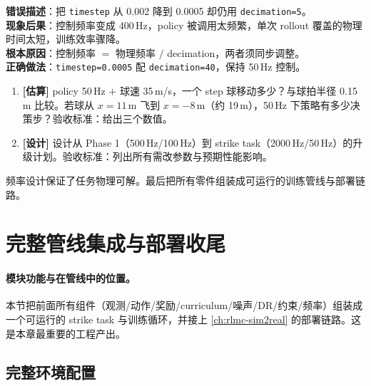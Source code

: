 \begin{pitfall}
\textbf{错误描述}：把 \verb|timestep| 从 0.002 降到 0.0005 却仍用 \verb|decimation=5|。\\
\textbf{现象后果}：控制频率变成 400\,Hz，policy 被调用太频繁，单次 rollout 覆盖的物理时间太短，训练效率骤降。\\
\textbf{根本原因}：控制频率 $=$ 物理频率 $/$ decimation，两者须同步调整。\\
\textbf{正确做法}：\verb|timestep=0.0005| 配 \verb|decimation=40|，保持 50\,Hz 控制。
\end{pitfall}

\begin{practice}[本节动手任务]
\begin{enumerate}
  \item \textbf{[估算]} policy 50\,Hz $+$ 球速 35\,m/s，一个 step 球移动多少？与球拍半径 0.15\,m 比较。若球从 $x=11$\,m 飞到 $x=-8$\,m（约 19\,m），50\,Hz 下策略有多少决策步？验收标准：给出三个数值。
  \item \textbf{[设计]} 设计从 Phase 1（500\,Hz/100\,Hz）到 strike task（2000\,Hz/50\,Hz）的升级计划。验收标准：列出所有需改参数与预期性能影响。
\end{enumerate}
\end{practice}

\noindent{}频率设计保证了任务物理可解。最后把所有零件组装成可运行的训练管线与部署链路。

\section{完整管线集成与部署收尾}
\label{sec:rlmc-strike-integration}

\paragraph{模块功能与在管线中的位置。}本节把前面所有组件（观测/动作/奖励/curriculum/噪声/DR/约束/频率）组装成一个可运行的 strike task 与训练循环，并接上 \cref{ch:rlmc-sim2real} 的部署链路。这是本章最重要的工程产出。

\subsection{完整环境配置}

